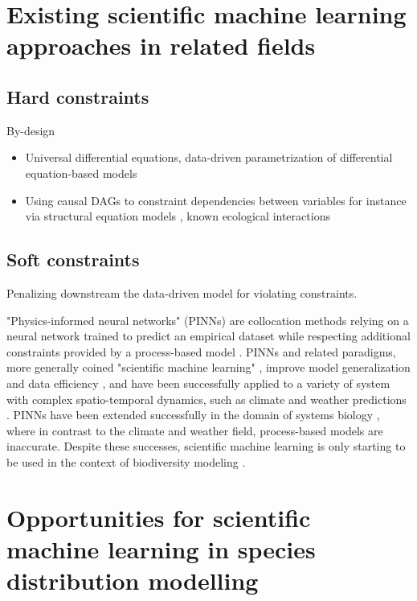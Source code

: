 \section{Existing scientific machine learning approaches in related fields}

\subsection{Hard constraints}
By-design
\begin{itemize}
    \item Universal differential equations, data-driven parametrization of differential equation-based models
    \item Using causal DAGs to constraint dependencies between variables for instance via structural equation models \cite{da2024towards}, known ecological interactions \cite{poggiato2025integrating}
\end{itemize}

\subsection{Soft constraints}
Penalizing downstream the data-driven model for violating constraints.

"Physics-informed neural networks" (PINNs) are collocation methods relying on a neural network trained to predict an empirical dataset while respecting additional constraints provided by a process-based model \cite{Raissi2019, Kashinath2021,daw2021,bezenac2018}. PINNs and related paradigms, more generally coined "scientific machine learning" \cite{Rackauckas2020}, improve model generalization and data efficiency \cite{Raissi2019, Rackauckas2020}, and have been successfully applied to a variety of system with complex spatio-temporal dynamics, such as climate and weather predictions \cite{Kashinath2021, lam2023, kochkov2024}. PINNs have been extended successfully in the domain of systems biology \cite{lagergren2020, Yazdani2020}, where in contrast to the climate and weather field, process-based models are inaccurate. Despite these successes, scientific machine learning is only starting to be used in the context of biodiversity modeling \cite{boussange2024}. 



\section{Opportunities for scientific machine learning in species distribution modelling}




